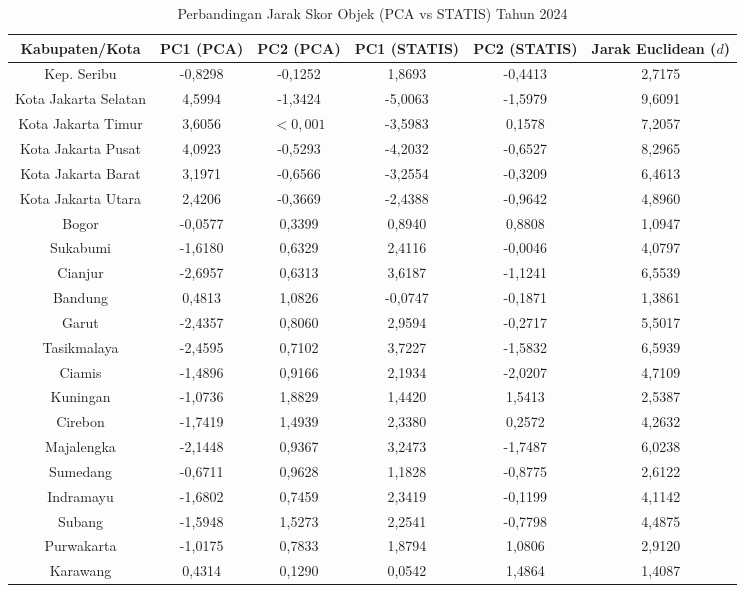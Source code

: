 \begin{table}[H]
\centering
\caption{Perbandingan Jarak Skor Objek (PCA vs STATIS) Tahun 2024} \label{tab:app2jarak_skor_2024}
\begin{adjustbox}{max width=\textwidth, max height=0.85\textheight}
\begin{tabular}{|c|c|c|c|c|c|}
\hline
\textbf{Kabupaten/Kota} & \textbf{PC1 (PCA)} & \textbf{PC2 (PCA)} & \textbf{PC1 (STATIS)} & \textbf{PC2 (STATIS)} & \textbf{Jarak Euclidean ($d$)} \\
\hline
Kep. Seribu & -0,8298 & -0,1252 & 1,8693 & -0,4413 & 2,7175 \\
Kota Jakarta Selatan & 4,5994 & -1,3424 & -5,0063 & -1,5979 & 9,6091 \\
Kota Jakarta Timur & 3,6056 & $< 0,001$ & -3,5983 & 0,1578 & 7,2057 \\
Kota Jakarta Pusat & 4,0923 & -0,5293 & -4,2032 & -0,6527 & 8,2965 \\
Kota Jakarta Barat & 3,1971 & -0,6566 & -3,2554 & -0,3209 & 6,4613 \\
Kota Jakarta Utara & 2,4206 & -0,3669 & -2,4388 & -0,9642 & 4,8960 \\
Bogor & -0,0577 & 0,3399 & 0,8940 & 0,8808 & 1,0947 \\
Sukabumi & -1,6180 & 0,6329 & 2,4116 & -0,0046 & 4,0797 \\
Cianjur & -2,6957 & 0,6313 & 3,6187 & -1,1241 & 6,5539 \\
Bandung & 0,4813 & 1,0826 & -0,0747 & -0,1871 & 1,3861 \\
Garut & -2,4357 & 0,8060 & 2,9594 & -0,2717 & 5,5017 \\
Tasikmalaya & -2,4595 & 0,7102 & 3,7227 & -1,5832 & 6,5939 \\
Ciamis & -1,4896 & 0,9166 & 2,1934 & -2,0207 & 4,7109 \\
Kuningan & -1,0736 & 1,8829 & 1,4420 & 1,5413 & 2,5387 \\
Cirebon & -1,7419 & 1,4939 & 2,3380 & 0,2572 & 4,2632 \\
Majalengka & -2,1448 & 0,9367 & 3,2473 & -1,7487 & 6,0238 \\
Sumedang & -0,6711 & 0,9628 & 1,1828 & -0,8775 & 2,6122 \\
Indramayu & -1,6802 & 0,7459 & 2,3419 & -0,1199 & 4,1142 \\
Subang & -1,5948 & 1,5273 & 2,2541 & -0,7798 & 4,4875 \\
Purwakarta & -1,0175 & 0,7833 & 1,8794 & 1,0806 & 2,9120 \\
Karawang & 0,4314 & 0,1290 & 0,0542 & 1,4864 & 1,4087 \\

\end{tabular}
\end{adjustbox}
\end{table}
